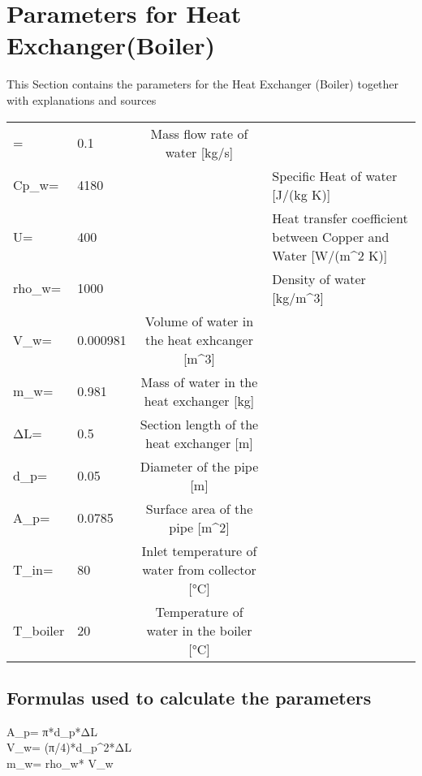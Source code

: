 \section{Parameters for Heat Exchanger(Boiler)} 

This Section contains the parameters for the Heat Exchanger (Boiler) together with explanations and sources 

\begin{tabular}{ l l |c| l} 
	\dot{m_{w}}=		&0.1		&Mass flow rate of water [kg/s]\\     	
	Cp_{w}=		&4180	&\cite{SpecificHeat}	&Specific Heat of water [J/(kg K)]\\     
	U=		&400	&\cite{HeatTransferCoefficientl}	&Heat transfer coefficient between Copper and Water [W/(m^{2} K)] \\
	rho_{w}=		&1000	&\cite{WaterDensity}	&Density of water [kg/m^{3}] \\
	V_{w}=		&0.000981		&Volume of water in the heat exhcanger [m^{3}]  \\
	m_{w}=		&0.981		&Mass of water in the heat exchanger [kg]  \\
	ΔL=		&0.5		&Section length of the heat exchanger [m]  \\
	d_{p}=		&0.05		&Diameter of the pipe [m]  \\
	A_{p}=		&0.0785		&Surface area of the pipe [m^{2}]  \\
	T_{in}=		&80	        &Inlet temperature of water from collector [°C]  \\
	T_{boiler}      &20      &Temperature of water in the boiler [°C] \\
	
	
\end{tabular}

\subsection{Formulas used to calculate the parameters}

    A_{p}= π*d_{p}*ΔL \\
    V_{w}= (π/4)*d_{p}^{2}*ΔL \\
	m_{w}= rho_{w}* V_{w} \\


